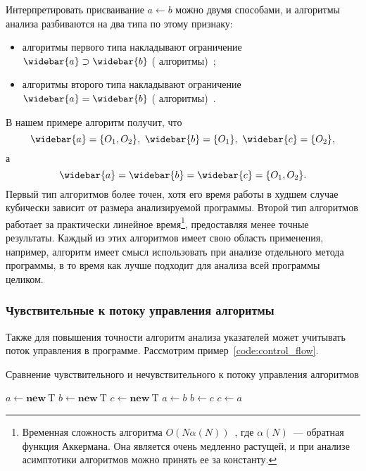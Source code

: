 \documentclass[14pt,titlepage,draft]{extarticle}
\newcommand{\type}[1]{\mathrm{#1}}
\newcommand{\op}[1]{\mathbf{#1}}
\newcommand{\pts}[1]{\widebar{#1}}
\begin{document}
        Интерпретировать присваивание $a \gets b$ можно двумя способами,
        и алгоритмы анализа разбиваются на два типа по этому признаку:
        \begin{itemize}
          \item алгоритмы первого типа накладывают ограничение
                $\pts{a} \supset \pts{b}$
                ( алгоритмы)~\cite{andersen};
          \item алгоритмы второго типа накладывают ограничение
                $\pts{a} = \pts{b}$
                ( алгоритмы)~\cite{steensgaard}.
        \end{itemize}
        В нашем примере  алгоритм получит, что
        \[\pts{a} = \{O_1, O_2\},\ \pts{b} = \{O_1\},\ \pts{c} = \{O_2\},\]
        а 
        \[\pts{a} = \pts{b} = \pts{c} = \{O_1, O_2\}.\]
        Первый тип алгоритмов более точен, хотя его время работы в худшем
        случае кубически зависит от размера анализируемой программы.
        Второй тип алгоритмов работает за практически линейное время\footnote{
          Временная сложность  алгоритма
          $O(N \alpha(N))$~\cite{steensgaard}, где $\alpha(N)$~--- обратная
          функция Аккермана. Она является очень медленно растущей, и при
          анализе асимптотики алгоритмов можно принять ее за константу.
        },
        предоставляя менее точные результаты.
        Каждый из этих алгоритмов имеет свою область применения, например,
         алгоритм имеет смысл использовать при анализе
        отдельного метода программы, в то время как  лучше
        подходит для анализа всей программы целиком.


      \subsubsection{Чувствительные к потоку управления алгоритмы}
        \label{section:analysis_classification_control_flow}

        Также для повышения точности алгоритм анализа указателей может
        учитывать поток управления в программе.
        Рассмотрим пример~\ref{code:control_flow}.

        \begin{algorithm}
          \caption{Сравнение чувствительного и нечувствительного к потоку
                   управления алгоритмов}
          \label{code:control_flow}
          \begin{algorithmic}[1]
            \State $a \gets \op{new}~\type{T}$
            \State $b \gets \op{new}~\type{T}$
            \State $c \gets \op{new}~\type{T}$ \label{code:control_flow:before_gets}
            \State $a \gets b$ \label{code:control_flow:after_gets}
            \State $b \gets c$
            \State $c \gets a$ \label{code:control_flow:end}
          \end{algorithmic}
        \end{algorithm}
\end{document}
